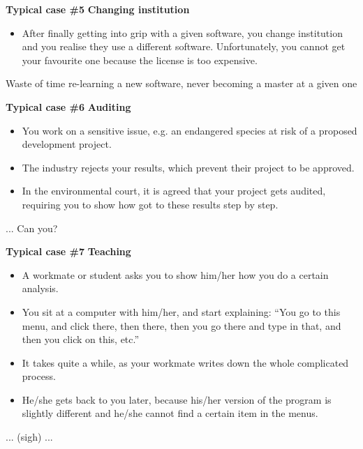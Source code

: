 \documentclass[9pt,xcolor=pdftex,dvipsnames,table]{beamer}
\begin{document}
\begin{frame}{\textbf{Typical case \#5}}
\textbf{Changing institution}
\begin{itemize}
\item After finally getting into grip with a given software, you
  change institution and you realise they use a different
  software. Unfortunately, you cannot get your favourite one because
  the license is too expensive.
\end{itemize}
\vspace{0.6cm}
Waste of time re-learning a new software, never becoming a master at a
given one
\vspace{-0.5cm}
\end{frame}


\begin{frame}{\textbf{Typical case \#6}}
\textbf{Auditing}
\begin{itemize}
\item You work on a sensitive issue, e.g. an endangered species at
  risk of a proposed development project.
\item The industry rejects your results, which prevent their project to
  be approved.
\item In the environmental court, it is agreed that your project gets
  audited, requiring you to show how got to these results step by step.
\end{itemize}
\vspace{0.6cm}
... Can you?
\vspace{-0.5cm}
\end{frame}



\begin{frame}{\textbf{Typical case \#7}}
\textbf{Teaching}
\begin{itemize}
\item A workmate or student asks you to show him/her how you do a
  certain analysis.
\item You sit at a computer with him/her, and start explaining: 
``You go to this menu, and click there, then there, then you go there
and type in that, and then you click on this, etc.''
\item It takes quite a while, as your workmate writes down the whole
  complicated process.
\item He/she gets back to you later, because his/her version of the
  program is slightly different and he/she cannot find a certain item
  in the menus.
\end{itemize}
\vspace{0.6cm}
... (sigh) ...
\vspace{-0.5cm}
\end{frame}
\end{document}

